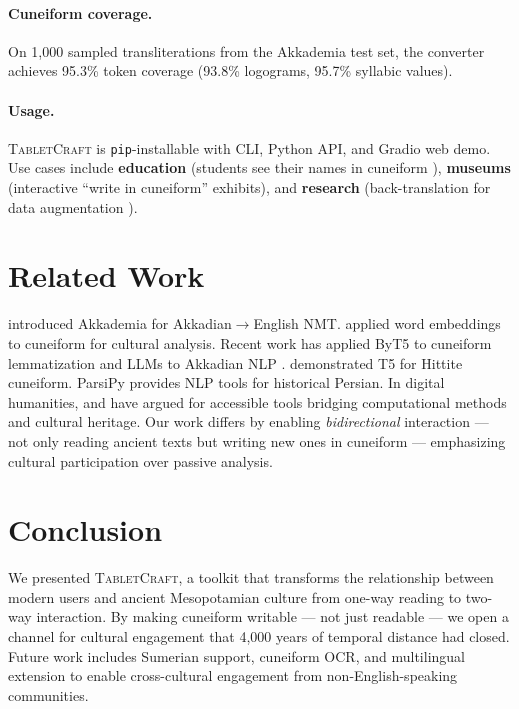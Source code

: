 \documentclass[11pt]{article}
\begin{document}
\paragraph{Cuneiform coverage.}
On 1,000 sampled transliterations from the Akkademia test set, the converter achieves 95.3\% token coverage (93.8\% logograms, 95.7\% syllabic values).

\paragraph{Usage.}
\textsc{TabletCraft} is \texttt{pip}-installable with CLI, Python API, and Gradio web demo.
Use cases include \textbf{education} (students see their names in cuneiform \cite{wagensonner2019digital}), \textbf{museums} (interactive ``write in cuneiform'' exhibits), and \textbf{research} (back-translation for data augmentation \cite{gordin2025evacun}).

\section{Related Work}

\citet{gutherz2023translating} introduced Akkademia for Akkadian$\rightarrow$English NMT.
\citet{gordin2020reading} applied word embeddings to cuneiform for cultural analysis.
Recent work has applied ByT5 to cuneiform lemmatization \cite{sahala2025byt5cuneiform} and LLMs to Akkadian NLP \cite{riemenschneider2025akkadian,gordin2025evacun}.
\citet{yavasan2025hittite} demonstrated T5 for Hittite cuneiform.
ParsiPy \cite{farsi2025parsipy} provides NLP tools for historical Persian.
In digital humanities, \citet{terras2022digitisation} and \citet{luo2024digitization} have argued for accessible tools bridging computational methods and cultural heritage.
Our work differs by enabling \textit{bidirectional} interaction --- not only reading ancient texts but writing new ones in cuneiform --- emphasizing cultural participation over passive analysis.

\section{Conclusion}

We presented \textsc{TabletCraft}, a toolkit that transforms the relationship between modern users and ancient Mesopotamian culture from one-way reading to two-way interaction.
By making cuneiform writable --- not just readable --- we open a channel for cultural engagement that 4,000 years of temporal distance had closed.
Future work includes Sumerian support, cuneiform OCR, and multilingual extension to enable cross-cultural engagement from non-English-speaking communities.
\end{document}
